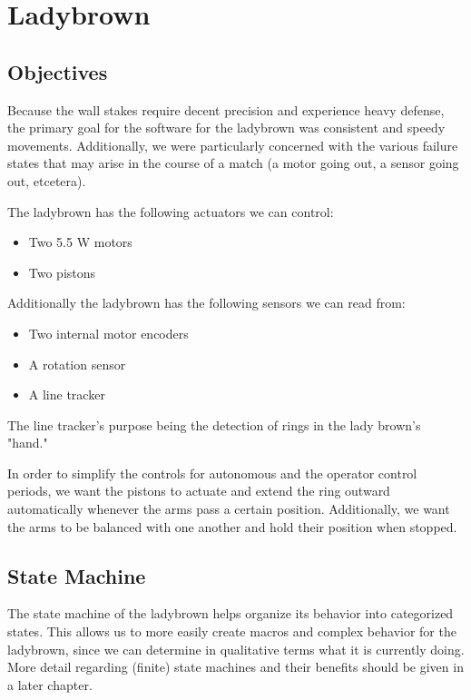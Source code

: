 \chapter{Ladybrown}
\section{Objectives}
Because the wall stakes require decent precision and experience heavy defense, the primary goal for the software for the ladybrown was consistent and speedy movements. Additionally, we were particularly concerned with the various failure states that may arise in the course of a match (a motor going out, a sensor going out, etcetera). 

The ladybrown has the following actuators we can control: 
\begin{itemize}
    \item Two 5.5 W motors
    \item Two pistons
\end{itemize}
Additionally the ladybrown has the following sensors we can read from:
\begin{itemize}
    \item Two internal motor encoders
    \item A rotation sensor
    \item A line tracker
\end{itemize}
The line tracker's purpose being the detection of rings in the lady brown's "hand."

In order to simplify the controls for autonomous and the operator control periods, we want the pistons to actuate and extend the ring outward automatically whenever the arms pass a certain position. Additionally, we want the arms to be balanced with one another and hold their position when stopped. 

\section{State Machine}
The state machine of the ladybrown helps organize its behavior into categorized states. This allows us to more easily create macros and complex behavior for the ladybrown, since we can determine in qualitative terms what it is currently doing. More detail regarding (finite) state machines and their benefits should be given in a later chapter. 

